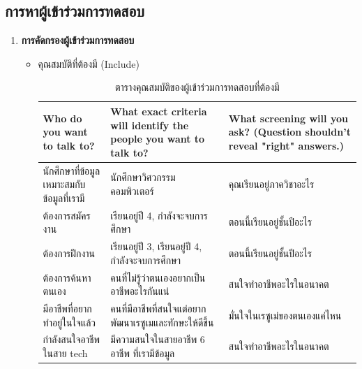 \subsection{การหาผู้เข้าร่วมการทดสอบ}
\begin{enumerate}
    \item \textbf{การคัดกรองผู้เข้าร่วมการทดสอบ}
          \begin{itemize}
            \item คุณสมบัติที่ต้องมี (Include)
            \begin{table}[H]
                \caption{ตารางคุณสมบัติของผู้เข้าร่วมการทดสอบที่ต้องมี}
                \label{tab:my-table}
                \begin{tabularx}{\textwidth}{|X|X|X|}
                \hline
                \textbf{Who do you want to talk to?}       & \textbf{What exact criteria will identify the people you want to talk to?} & \textbf{What screening will you ask? (Question shouldn't reveal "right" answers.)} \\ \hline
                นักศึกษาที่ข้อมูลเหมาะสมกับข้อมูลที่เรามี  & นักศึกษาวิศวกรรมคอมพิวเตอร์                                                & คุณเรียนอยู่ภาควิชาอะไร                                                            \\ \hline
                ต้องการสมัครงาน                            & เรียนอยู่ปี 4, กำลังจะจบการศึกษา                                           & ตอนนี้เรียนอยู่ชั้นปีอะไร                                                          \\ \hline
                ต้องการฝึกงาน                              & เรียนอยู่ปี 3, เรียนอยู่ปี 4, กำลังจะจบการศึกษา                            & ตอนนี้เรียนอยู่ชั้นปีอะไร                                                          \\ \hline
                ต้องการค้นหาตนเอง                          & คนที่ไม่รู้ว่าตนเองอยากเป็นอาชีพอะไรกันแน่                                 & สนใจทำอาชีพอะไรในอนาคต                                                             \\ \hline
                มีอาชีพที่อยากทำอยู่ในใจแล้ว               & คนที่มีอาชีพที่สนใจแต่อยากพัฒนาเรซูเมและทักษะให้ดีขึ้น                     & มั่นใจในเรซูเม่ของตนเองแค่ไหน                                                      \\ \hline
                กำลังสนใจอาชีพในสาย tech                   & มีความสนใจในสายอาชีพ 6 อาชีพ ที่เรามีข้อมูล                                & สนใจทำอาชีพอะไรในอนาคต                                                             \\ \hline

\end{tabularx}
\end{table}
\end{itemize}
\end{enumerate}

